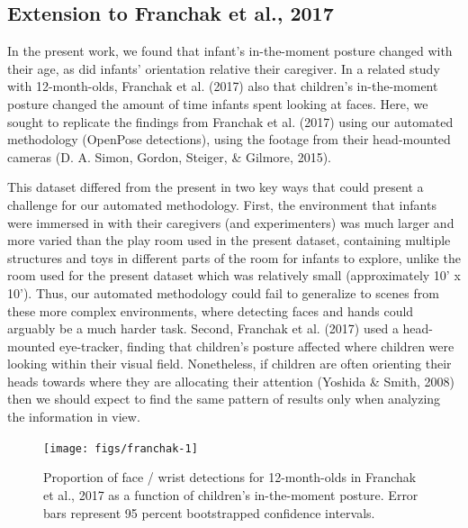 \documentclass[english,man]{apa6}
\begin{document}
\subsection{Extension to Franchak et al.,
2017}\label{extension-to-franchak-et-al.-2017}

In the present work, we found that infant's in-the-moment posture
changed with their age, as did infants' orientation relative their
caregiver. In a related study with 12-month-olds, Franchak et al. (2017)
also that children's in-the-moment posture changed the amount of time
infants spent looking at faces. Here, we sought to replicate the
findings from Franchak et al. (2017) using our automated methodology
(OpenPose detections), using the footage from their head-mounted cameras
(D. A. Simon, Gordon, Steiger, \& Gilmore, 2015).

This dataset differed from the present in two key ways that could
present a challenge for our automated methodology. First, the
environment that infants were immersed in with their caregivers (and
experimenters) was much larger and more varied than the play room used
in the present dataset, containing multiple structures and toys in
different parts of the room for infants to explore, unlike the room used
for the present dataset which was relatively small (approximately 10' x
10'). Thus, our automated methodology could fail to generalize to scenes
from these more complex environments, where detecting faces and hands
could arguably be a much harder task. Second, Franchak et al. (2017)
used a head-mounted eye-tracker, finding that children's posture
affected where children were looking within their visual field.
Nonetheless, if children are often orienting their heads towards where
they are allocating their attention (Yoshida \& Smith, 2008) then we
should expect to find the same pattern of results only when analyzing
the information in view.

\begin{figure}[H]

{\centering \texttt{[image: figs/franchak-1]} 

}

\caption{Proportion of face / wrist detections for 12-month-olds in Franchak et al., 2017 as a function of children's in-the-moment posture. Error bars represent 95 percent bootstrapped confidence intervals.}\label{fig:franchak}
\end{figure}
\end{document}
